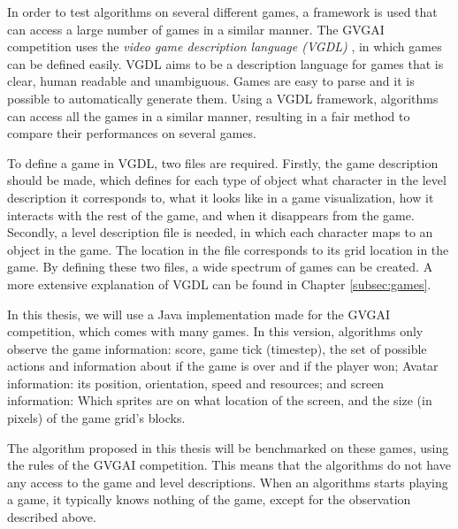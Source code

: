 In order to test algorithms on several different games, a framework is used that
can access a large number of games in a similar manner. The GVGAI competition
uses the \emph{video game description language (VGDL)} \cite{schaul2013video},
in which games can be defined easily. VGDL aims to be a description language
for games that is clear, human readable and unambiguous. Games are easy to parse
and it is possible to automatically generate them. Using a VGDL framework,
algorithms can access all the games in a similar manner, resulting in a fair
method to compare their performances on several games.

To define a game in VGDL, two files are required. Firstly, the game description
should be made, which defines for each type of object what character in the
level description it corresponds to, what it looks like in a game visualization,
how it interacts with the rest of the game, and when it disappears from the
game. Secondly, a level description file is needed, in which each character maps
to an object in the game. The location in the file corresponds to its grid
location in the game. By defining these two files, a wide spectrum of games
can be created. A more extensive explanation of VGDL can be found in Chapter
\ref{subsec:games}.

In this thesis, we will use a Java implementation made for the GVGAI
competition, which comes with many games. In this version, algorithms only
observe the game information: score, game tick (timestep), the set of possible
actions and information about if the game is over and if the player won; Avatar
information: its position, orientation, speed and resources; and screen
information: Which sprites are on what location of the screen, and the size (in
pixels) of the game grid's blocks.

The algorithm proposed in this thesis will be
benchmarked on these games, using the rules of the GVGAI competition. 
This means that the algorithms do not have any access to the game and level
descriptions. When an algorithms starts playing a game, it typically knows
nothing of the game, except for the observation described above.
